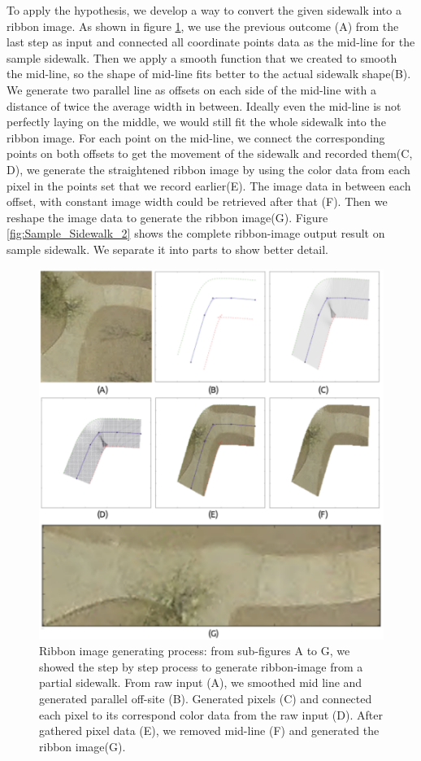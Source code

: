 To apply the hypothesis, we develop a way to convert the given sidewalk into a ribbon image. 
As shown in figure \ref{fig:StraightenProcess}, we use the previous outcome (A) from the last step as input and connected all coordinate points data as the mid-line for the sample sidewalk. 
Then we apply a smooth function that we created to smooth the mid-line, so the shape of mid-line fits better to the actual sidewalk shape(B). 
We generate two parallel line as offsets on each side of the mid-line with a distance of twice the average width in between. 
Ideally even the mid-line is not perfectly laying on the middle, we would still fit the whole sidewalk into the ribbon image. 
For each point on the mid-line, we connect the corresponding points on both offsets to get the movement of the sidewalk and recorded them(C, D), we generate the straightened ribbon image by using the color data from each pixel in the points set that we record earlier(E). 
The image data in between each offset, with constant image width could be retrieved after that (F).
Then we reshape the image data to generate the ribbon image(G). 
Figure \ref{fig:Sample_Sidewalk_2} shows the complete ribbon-image output result on sample sidewalk. We separate it into parts to show better detail. 

\begin{figure}[H]
    \centering
    \includegraphics[width=\textwidth]{Figures/straghten.pdf}
    \caption[Ribbon Image Generation]{Ribbon image generating process: from sub-figures A to G, we showed the step by step process to generate ribbon-image from a partial sidewalk. From raw input (A), we smoothed mid line and generated parallel off-site (B). Generated pixels (C) and connected each pixel to its correspond color data from the raw input (D). After gathered pixel data (E), we removed mid-line (F) and generated the ribbon image(G).}
    \label{fig:StraightenProcess}
\end{figure}

